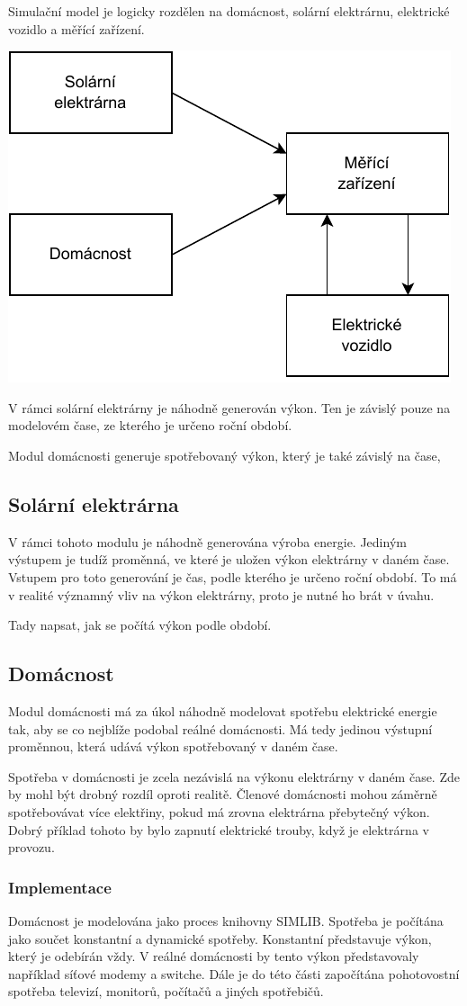 \documentclass[12pt,a4paper]{article}
\begin{document}
Simulační model je logicky rozdělen na domácnost, solární elektrárnu, elektrické vozidlo a měřící zařízení.

\bigskip
\includegraphics[width=0.5\linewidth]{img/diagram.pdf}
\bigskip

V rámci solární elektrárny je náhodně generován výkon.
Ten je závislý pouze na modelovém čase, ze kterého je určeno roční období.

Modul domácnosti generuje spotřebovaný výkon, který je také závislý na čase,


\subsection{Solární elektrárna}
V rámci tohoto modulu je náhodně generována výroba energie.
Jediným výstupem je tudíž proměnná, ve které je uložen výkon elektrárny v daném čase.
Vstupem pro toto generování je čas, podle kterého je určeno roční období.
To má v realité významný vliv na výkon elektrárny, proto je nutné ho brát v úvahu.


Tady napsat, jak se počítá výkon podle období.


\subsection{Domácnost}
Modul domácnosti má za úkol náhodně modelovat spotřebu elektrické energie tak,
aby se co nejblíže podobal reálné domácnosti.
Má tedy jedinou výstupní proměnnou, která udává výkon spotřebovaný v daném čase.

Spotřeba v domácnosti je zcela nezávislá na výkonu elektrárny v daném čase.
Zde by mohl být drobný rozdíl oproti realitě.
Členové domácnosti mohou záměrně spotřebovávat více elektřiny, pokud má zrovna elektrárna přebytečný výkon.
Dobrý příklad tohoto by bylo zapnutí elektrické trouby, když je elektrárna v provozu.

\subsubsection{Implementace}
Domácnost je modelována jako proces knihovny SIMLIB.
Spotřeba je počítána jako součet konstantní a dynamické spotřeby.
Konstantní představuje výkon, který je odebírán vždy.
V reálné domácnosti by tento výkon představovaly například síťové modemy a switche.
Dále je do této části započítána pohotovostní spotřeba televizí, monitorů, počítačů a jiných spotřebičů.
\end{document}
